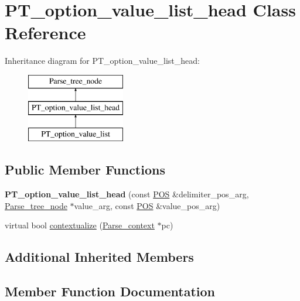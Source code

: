 \hypertarget{classPT__option__value__list__head}{}\section{P\+T\+\_\+option\+\_\+value\+\_\+list\+\_\+head Class Reference}
\label{classPT__option__value__list__head}
Inheritance diagram for P\+T\+\_\+option\+\_\+value\+\_\+list\+\_\+head\+:\begin{figure}[H]
\begin{center}
\leavevmode
\includegraphics[height=3.000000cm]{classPT__option__value__list__head}
\end{center}
\end{figure}
\subsection*{Public Member Functions}
\begin{DoxyCompactItemize}
\item 
\mbox{\label{classPT__option__value__list__head_a5ee525f6e304ddb228b7726de1178724}} 
{\bfseries P\+T\+\_\+option\+\_\+value\+\_\+list\+\_\+head} (const \mbox{\hyperlink{structYYLTYPE}{P\+OS}} \&delimiter\+\_\+pos\+\_\+arg, \mbox{\hyperlink{classParse__tree__node}{Parse\+\_\+tree\+\_\+node}} $\ast$value\+\_\+arg, const \mbox{\hyperlink{structYYLTYPE}{P\+OS}} \&value\+\_\+pos\+\_\+arg)
\item 
virtual bool \mbox{\hyperlink{classPT__option__value__list__head_a211f236acebccd35113f7f991dc9d2fb}{contextualize}} (\mbox{\hyperlink{structParse__context}{Parse\+\_\+context}} $\ast$pc)
\end{DoxyCompactItemize}
\subsection*{Additional Inherited Members}


\subsection{Member Function Documentation}
\mbox{\label{classPT__option__value__list__head_a211f236acebccd35113f7f991dc9d2fb}} 
